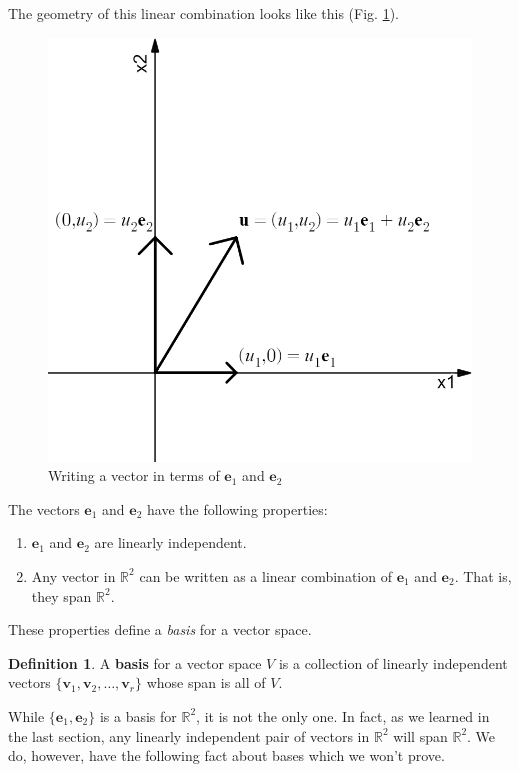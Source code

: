 \documentclass[
]{book}
\theoremstyle{definition}
\newtheorem{definition}{Definition}[chapter]
\theoremstyle{definition}
\theoremstyle{definition}
\theoremstyle{definition}
\theoremstyle{remark}
\begin{document}
The geometry of this linear combination looks like this (Fig. \ref{fig:stdbasispic}).

\begin{figure}

{\centering \includegraphics[width=0.5\linewidth]{images/sbv} 

}

\caption{Writing a vector in terms of $\mathbf{e}_1$ and $\mathbf{e}_2$}\label{fig:stdbasispic}
\end{figure}

The vectors \(\mathbf{e}_1\) and \(\mathbf{e}_2\) have the following properties:

\begin{enumerate}
\def\labelenumi{\arabic{enumi}.}
\item
  \(\mathbf{e}_1\) and \(\mathbf{e}_2\) are linearly independent.
\item
  Any vector in \(\mathbb{R}^2\) can be written as a linear combination of \(\mathbf{e}_1\) and \(\mathbf{e}_2\). That is, they span \(\mathbb{R}^2\).
\end{enumerate}

These properties define a \emph{basis} for a vector space.

\begin{defbox}

\begin{definition}
A \textbf{basis} for a vector space \(V\) is a collection of linearly independent vectors \(\{\mathbf{v}_1,\mathbf{v}_2,\dots,\mathbf{v}_r\}\)
whose span is all of \(V\).
\end{definition}

\end{defbox}

While \(\{\mathbf{e}_1,\mathbf{e}_2\}\) is a basis for \(\mathbb{R}^2\), it is not the only one. In fact, as we learned in the last section, any linearly independent pair of vectors in \(\mathbb{R}^2\) will span \(\mathbb{R}^2\). We do, however, have the following fact about bases which we won't prove.
\end{document}
